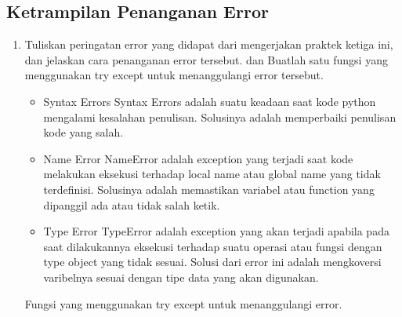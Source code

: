 \subsection{Ketrampilan Penanganan Error}
\begin{enumerate}
    \item Tuliskan  peringatan  error  yang  didapat  dari  mengerjakan  praktek ketiga  ini, dan  jelaskan  cara  penanganan  error  tersebut.   dan  Buatlah  satu fungsi  yang menggunakan try except untuk menanggulangi error tersebut.
\begin{itemize}
	\item Syntax Errors
	Syntax Errors adalah suatu keadaan saat kode python mengalami kesalahan penulisan. Solusinya adalah memperbaiki penulisan kode yang salah.
	
	\item Name Error
	NameError adalah exception yang terjadi saat kode melakukan eksekusi terhadap local name atau global name yang tidak terdefinisi. Solusinya adalah memastikan variabel atau function yang dipanggil ada atau tidak salah ketik.
	
	\item Type Error
	TypeError adalah exception yang akan terjadi apabila pada saat dilakukannya eksekusi terhadap suatu operasi atau fungsi dengan type object yang tidak sesuai. Solusi dari error ini adalah mengkoversi varibelnya sesuai dengan tipe data yang akan digunakan.
\end{itemize}
\par Fungsi yang menggunakan try except untuk menanggulangi error.

\end{enumerate}
